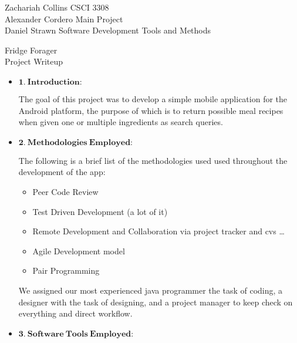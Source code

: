 \documentclass[a4paper,11pt]{article}
\begin{document}
\noindent
Zachariah Collins	\hfill CSCI 3308 \\
Alexander Cordero	\hfill Main Project \\
Daniel Strawn		\hfill Software Development Tools and Methods \\

\begin{center}
\LARGE
Fridge Forager
\\
\Large
Project Writeup
\end{center}

\begin{itemize}
\large
\item $\mathbf{1.\ Introduction:}$

\parindent 30pt
The goal of this project was to develop a simple mobile application for the Android platform, the purpose of which is to return possible meal recipes when given one or multiple ingredients as search queries.
\

\item $\mathbf{2.\ Methodologies\ Employed:}$

\parindent 30pt
The following is a brief list of the methodologies used used throughout the development of the app:

\begin{itemize}
\item Peer Code Review
\item Test Driven Development (a lot of it)
\item Remote Development and Collaboration via project tracker and cvs \ldots
\item Agile Development model
\item Pair Programming
\end{itemize}
We assigned our most experienced java programmer the task of coding, a designer with the task of designing, and a project manager to keep check on everything and direct workflow.

\newpage
\item $\mathbf{3.\ Software\ Tools\ Employed:}$


\end{itemize}
\end{document}
